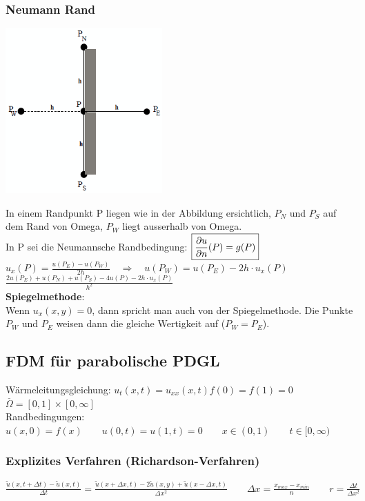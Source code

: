 \subsubsection{Neumann Rand 
}
\begin{minipage}{6cm}
	\includegraphics[width=6cm]{Content/Numerik/NeumannRand.png}


\end{minipage}
\hfill
\begin{minipage}{13cm}
In einem Randpunkt P liegen wie in der Abbildung ersichtlich, $P_N$ und $P_S$ auf dem Rand von Omega, $P_W$ liegt ausserhalb von Omega.\\
In P sei die Neumannsche Randbedingung: $\boxed{\frac{\partial u}{\partial n}(P)=g(P)}$\\
$u_x(P)=\frac{u(P_E)-u(P_W)}{2h}\quad\Rightarrow\quad u(P_W)=u(P_E)-2h\cdot u_x(P)$\\

$\boxed{\frac{2u(P_E) + u(P_N) +
u(P_S)- 4 u(P) - 2h\cdot u_x(P)}{h^2}}$\\


\textbf{Spiegelmethode}:\\
Wenn $u_x(x,y) = 0$, dann spricht man auch von der Spiegelmethode. Die Punkte $P_W$ und $P_E$ weisen dann die gleiche Wertigkeit auf ($P_W=P_E$).
\end{minipage}


\subsection{FDM für parabolische PDGL}
	Wärmeleitungsgleichung: $\boxed{u_t(x,t)=u_{xx}(x,t)}$\qquad $f(0)=f(1)=0$ \qquad$ \overset{\_}{\Omega}=[0,1]\times [0,\infty]$\\
	
	Randbedingungen: $u(x,0)=f(x) \qquad u(0,t)=u(1,t)=0\qquad x\in(0,1) \qquad t\in[0,\infty)$
\subsubsection{Explizites Verfahren (Richardson-Verfahren)}
$\boxed{\frac{\tilde{u}(x,t+\Delta t) - \tilde{u}(x,t)}{\Delta t} = 
\frac{\tilde{u}(x+\Delta x, t)-2\tilde{u}(x,y) + \tilde{u}( x - \Delta x, t )} {\Delta x^2}} \qquad \Delta x=\frac{x_{max}-x_{min}}{n} \qquad \boxed{r=\frac{\Delta
t}{\Delta x^2}}$\\

